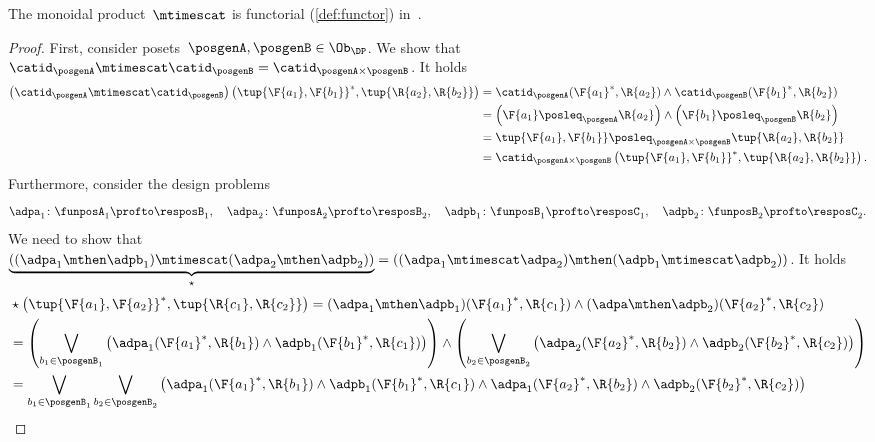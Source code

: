 \begin{lemma}
    \label{lem:monoidal_functorial}
    The monoidal product~$\mtimescat$ is functorial (\cref{def:functor}) in~\DP.
\end{lemma}
\begin{proof}
    First, consider posets~$\posgenA,\posgenB\in \Ob_\DP$. We show that~$\catid_\posgenA\mtimescat \catid_\posgenB = \catid_{\posgenA\times \posgenB}$. It holds
    \begin{equation}
        \begin{aligned}
            \left( \catid_{\posgenA}\mtimescat \catid_{\posgenB}\right)
            \left( \tup{\F{a_1},\F{b_1}}^*,\tup{\R{a_2},\R{b_2}}\right)&=
            \catid_\posgenA(\F{a_1}^*,\R{a_2})\wedge \catid_\posgenB(\F{b_1}^*,\R{b_2})\\
            &=\left( \F{a_1}\posleq_\posgenA \R{a_2}\right)\wedge \left( \F{b_1}\posleq_\posgenB \R{b_2}\right)\\
            &=\tup{\F{a_1},\F{b_1}}\posleq_{\posgenA\times \posgenB}\tup{\R{a_2},\R{b_2}}\\
            &=\catid_{\posgenA\times \posgenB}\left( \tup{\F{a_1},\F{b_1}}^*,\tup{\R{a_2},\R{b_2}}\right).
        \end{aligned}
    \end{equation}
    Furthermore, consider the design problems
    \begin{equation*}
        \adpa_1\colon \funposA_1 \profto \resposB_1,\quad \adpa_2\colon \funposA_2\profto \resposB_2, \quad \adpb_1\colon \funposB_1\profto \resposC_1,\quad \adpb_2\colon \funposB_2\profto \resposC_2.
    \end{equation*}
    We need to show that~$\underbrace{\left( (\adpa_1\mthen \adpb_1) \mtimescat (\adpa_2\mthen \adpb_2)\right)}_{\star}=\left( (\adpa_1\mtimescat \adpa_2)\mthen (\adpb_1\mtimescat \adpb_2)\right)$.
    It holds
    \begin{equation}
        \begin{aligned}
            &\star \left( \tup{\F{a_1},\F{a_2}}^*,\tup{\R{c_1},\R{c_2}}\right)=(\adpa_1\mthen \adpb_1)(\F{a_1}^*,\R{c_1})\wedge (\adpa\mthen \adpb_2)(\F{a_2}^*,\R{c_2})\\
            &=\left(\bigvee_{b_1\in \posgenB_1}\left( \adpa_1(\F{a_1}^*,\R{b_1})\wedge \adpb_1(\F{b_1}^*,\R{c_1})\right)\right) \wedge\left(\bigvee_{b_2\in \posgenB_2}\left( \adpa_2(\F{a_2}^*,\R{b_2})\wedge \adpb_2(\F{b_2}^*,\R{c_2})\right)\right)\\
            &=\bigvee_{b_1\in \posgenB_1}\bigvee_{b_2\in \posgenB_2} \left(\adpa_1(\F{a_1}^*,\R{b_1})\wedge \adpb_1(\F{b_1}^*,\R{c_1})\wedge \adpa_1(\F{a_2}^*,\R{b_2})\wedge \adpb_2(\F{b_2}^*,\R{c_2}) \right)\\

\end{aligned}
\end{equation}
\end{proof}
